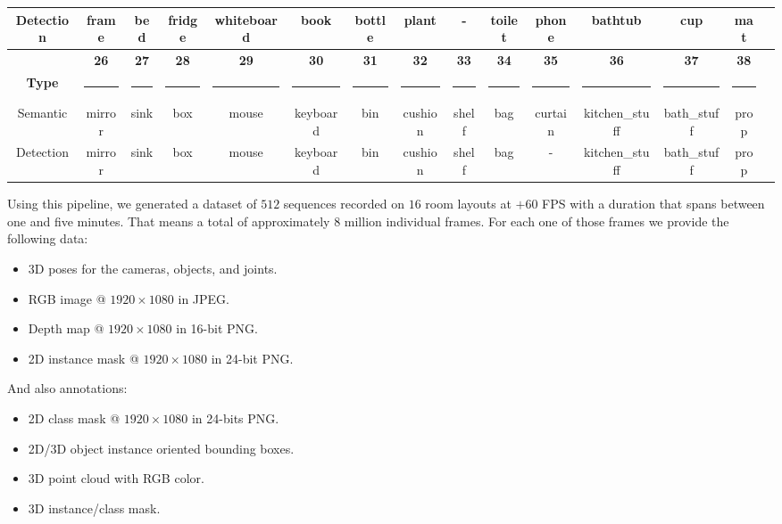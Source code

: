 \begin{table}[!tb]
{\begin{tabular}{|c|c|c|c|c|c|c|c|c|c|c|c|c|c|c|}
    Detection & frame & bed & fridge & whiteboard & book & bottle & plant & - & toilet & phone & bathtub & cup & mat\\
    \hline
    & \textbf{26} & \textbf{27} & \textbf{28} & \textbf{29} & \textbf{30} & \textbf{31} & \textbf{32} & \textbf{33} & \textbf{34} & \textbf{35} & \textbf{36} & \textbf{37} & \textbf{38}\\
    \textbf{Type} & \textcolor{rgb26}{\rule{0.75cm}{0.25cm}}& \textcolor{rgb27}{\rule{0.75cm}{0.25cm}}& \textcolor{rgb28}{\rule{0.75cm}{0.25cm}}& \textcolor{rgb29}{\rule{0.75cm}{0.25cm}}& \textcolor{rgb30}{\rule{0.75cm}{0.25cm}}& \textcolor{rgb31}{\rule{0.75cm}{0.25cm}}& \textcolor{rgb32}{\rule{0.75cm}{0.25cm}}& \textcolor{rgb33}{\rule{0.75cm}{0.25cm}}& \textcolor{rgb34}{\rule{0.75cm}{0.25cm}}& \textcolor{rgb35}{\rule{0.75cm}{0.25cm}}& \textcolor{rgb36}{\rule{0.75cm}{0.25cm}}& \textcolor{rgb37}{\rule{0.75cm}{0.25cm}}& \textcolor{rgb38}{\rule{0.75cm}{0.25cm}}\\
    \hline
    Semantic & mirror & sink & box & mouse & keyboard & bin & cushion & shelf & bag & curtain & kitchen\_stuff & bath\_stuff & prop\\
    Detection & mirror & sink & box & mouse & keyboard & bin & cushion & shelf & bag & - & kitchen\_stuff & bath\_stuff & prop\\
    \hline
  \end{tabular}}
  \label{table:classes}
\end{table}

Using this pipeline, we generated a dataset of $512$ sequences recorded on $16$ room layouts at $+60$ \ac{FPS} with a duration that spans between one and five minutes. That means a total of approximately $8$ million individual frames. For each one of those frames we provide the following data:

\begin{itemize}
  \item 3D poses for the cameras, objects, and joints.
  \item RGB image @ $1920\times1080$ in JPEG.
  \item Depth map @ $1920\times1080$ in 16-bit PNG.
  \item 2D instance mask @ $1920\times1080$ in 24-bit PNG.
\end{itemize}

And also annotations:

\begin{itemize}
  \item 2D class mask @ $1920\times1080$ in 24-bits PNG.
  \item 2D/3D object instance oriented bounding boxes.
  \item 3D point cloud with RGB color.
  \item 3D instance/class mask.
\end{itemize}

